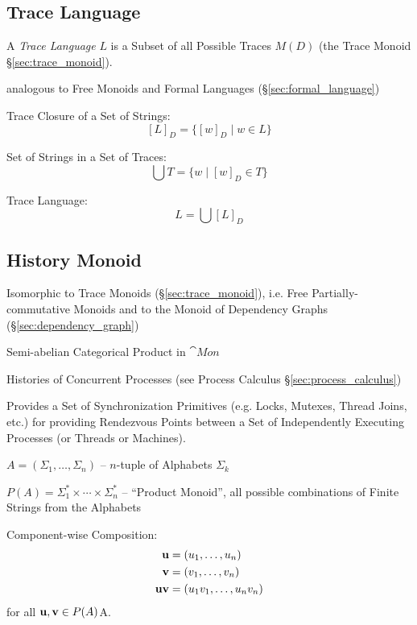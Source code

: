 \subsection{Trace Language}\label{sec:trace_language}

A \emph{Trace Language} $L$ is a Subset of all Possible Traces $M(D)$
(the Trace Monoid \S\ref{sec:trace_monoid}).

analogous to Free Monoids and Formal Languages
(\S\ref{sec:formal_language})

Trace Closure of a Set of Strings:
\[
  [L]_D = \{[w]_D \mid w \in L\}
\]

Set of Strings in a Set of Traces:
\[
  \bigcup T = \{w \mid [w]_D \in T\}
\]

Trace Language:
\[
  L = \bigcup [L]_D
\]



\subsection{History Monoid}\label{sec:history_monoid}

Isomorphic to Trace Monoids (\S\ref{sec:trace_monoid}), i.e. Free
Partially-commutative Monoids and to the Monoid of Dependency Graphs
(\S\ref{sec:dependency_graph})

Semi-abelian Categorical Product in $\cat{Mon}$

Histories of Concurrent Processes (see Process Calculus
\S\ref{sec:process_calculus})

Provides a Set of Synchronization Primitives (e.g. Locks, Mutexes,
Thread Joins, etc.) for providing Rendezvous Points between a Set of
Independently Executing Processes (or Threads or Machines).

$A = (\Sigma_1, \ldots, \Sigma_n)$ -- $n$-tuple of Alphabets
$\Sigma_k$

$P(A) = \Sigma_1^* \times \cdots \times \Sigma_n^*$ -- ``Product
Monoid'', all possible combinations of Finite Strings from the
Alphabets %

Component-wise Composition:
\begin{align*}
  \mathbf{u} &= (u_1, \ldots, u_n) \\
  \mathbf{v} &= (v_1, \ldots, v_n) \\
  \mathbf{uv} &= (u_1 v_1, \ldots, u_n v_n)
\end{align*}
for all $\mathbf{u},\mathbf{v} \in P(A)$A.

